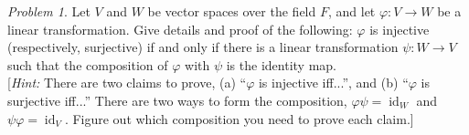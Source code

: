\documentclass[11pt]{paper}
\theoremstyle{remark}
\newtheorem{problem}{Problem}
\newcommand\0{\ensuremath{\mathbf{0}}}
\newcommand{\<}{\ensuremath{\langle}}
\renewcommand{\>}{\ensuremath{\rangle}}
\newcommand{\id}{\ensuremath{\operatorname{id}}}
\renewcommand{\phi}{\ensuremath{\varphi}}
\begin{document}
\begin{problem}  %
Let $V$ and $W$ be vector spaces over the field $F$, and let 
$\phi : V \rightarrow W$ be a linear transformation. Give details and proof of
the following: $\phi$ is injective (respectively, surjective) if and only if 
there is a linear transformation $\psi: W \rightarrow V$ such that the
composition of $\phi$ with $\psi$ is the identity map.\\[4pt]
[{\it Hint:} There are two claims to prove, (a) ``$\phi$
  is injective iff...'', and (b) ``$\phi$ is surjective
  iff...'' There are two ways to form the composition, 
$\phi \psi = \id_W$ and $\psi \phi = \id_V$. Figure out which composition
you need to prove each claim.]
\end{problem}
\end{document}
